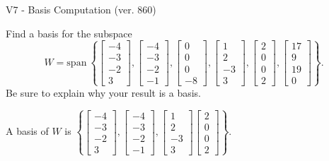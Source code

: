 \begin{exercise}
  \begin{exerciseTitle}V7 - Basis Computation (ver. 860)\end{exerciseTitle}
  \begin{exerciseStatement}
    Find a basis for the subspace 
\[W=\mathrm{span}\ \left\{\left[\begin{array}{r}
-4 \\
-3 \\
-2 \\
3
\end{array}\right] , \left[\begin{array}{r}
-4 \\
-3 \\
-2 \\
-1
\end{array}\right] , \left[\begin{array}{r}
0 \\
0 \\
0 \\
-8
\end{array}\right] , \left[\begin{array}{r}
1 \\
2 \\
-3 \\
3
\end{array}\right] , \left[\begin{array}{r}
2 \\
0 \\
0 \\
2
\end{array}\right] , \left[\begin{array}{r}
17 \\
9 \\
19 \\
0
\end{array}\right]\right\}.\]
 Be sure to explain why your result is a basis.


  \end{exerciseStatement}
  \begin{exerciseAnswer}
   A basis of \(W\) is  \(\left\{\left[\begin{array}{r}
-4 \\
-3 \\
-2 \\
3
\end{array}\right] , \left[\begin{array}{r}
-4 \\
-3 \\
-2 \\
-1
\end{array}\right] , \left[\begin{array}{r}
1 \\
2 \\
-3 \\
3
\end{array}\right] \left[\begin{array}{r}
2 \\
0 \\
0 \\
2
\end{array}\right]\right\}\).
  


  \end{exerciseAnswer}
\end{exercise}